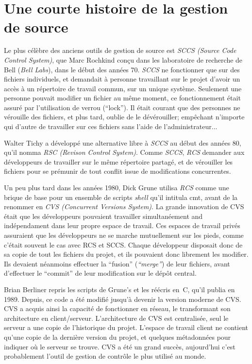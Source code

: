 \section{Une courte histoire de la gestion de source}

Le plus célèbre des anciens outils de gestion de source est \textit{SCCS (Source
Code Control System)}, que Marc Rochkind conçu dans les laboratoire de recherche de Bell 
(\textit{Bell Labs}), dans le début des années 70. \textit{SCCS} ne fonctionner que sur des fichiers individuels, et demandait à personne travaillant sur le projet d'avoir un accès à un répertoire de travail commun, sur un unique système.
Seulement une personne pouvait modifier un fichier au même moment, ce fonctionnement était assuré par l'utilisation de verrou (``lock''). Il était courant que des personnes ne vérouille
des fichiers, et plus tard, oublie de le dévérouiller; empêchant  n'importe qui d'autre de 
travailler sur ces fichiers sans l'aide de l'administrateur...

Walter Tichy a développé une alternative libre à \textit{SCCS} au début des années 80, qu'il
nomma \textit{RSC (Revison Control System)}.  Comme \textit{SCCS}, \textit{RCS}
demander aux développeurs de travailler sur le même répertoire partagé, et de vérouiller les
fichiers pour se prémunir de tout conflit issue de modifications concurrentes.

Un peu plus tard dans les années 1980, Dick Grune utilisa \textit{RCS} comme une brique de base pour un ensemble de scripts \textit{shell} qu'il intitula cmt, avant de la renommer en \textit{CVS (Concurrent Versions System)}.  La grande innovation de CVS était que les développeurs pouvaient travailler simultanéement and indépendament dans leur propre espace de travail. Ces espaces de travail privés assuraient que les développeurs ne se marche mutuellement sur les pieds, comme c'était souvent le cas avec RCS et SCCS. Chaque développeur disposait donc de sa copie de tout les fichiers du projet, et ils pouvaient donc librement les modifier. Ils devaient néanmoins effectuer la ``fusion'' (\textit{``merge''}) de leur fichiers, avant d'effectuer le ``commit'' de leur modification sur le dépôt central.

Brian Berliner repris les scripts de Grune's et les réécris en~C, qu'il publia en 1989. Depuis, ce code a été modifié jusqu'à devenir la version moderne de CVS. CVS a acquis ainsi la capacité de fonctionner en réseau, le transformant son architecture en client/serveur. L'architecture de CVS est centralisée, seul le serveur a une copie de l'historique du projet. L'espace de travail client ne contient qu'une copie de la dernière version du projet, et quelques métadonnées pour indiquer où le serveur se trouve. CVS a été un grand succès, aujourd'hui c'est probablement l'outil de gestion de contrôle le plus utilisé au monde. 

